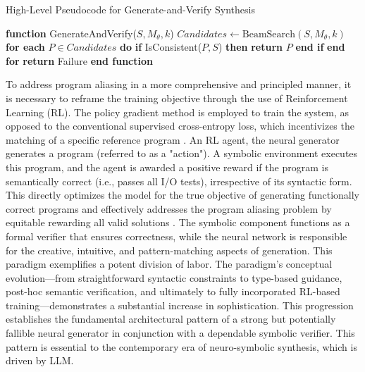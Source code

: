 \documentclass[12pt, a4paper]{report}
\begin{document}
\begin{algorithm}
\caption{High-Level Pseudocode for Generate-and-Verify Synthesis}
\label{alg:generate_verify}
\begin{algorithmic}[1]
\STATE \textbf{function} GenerateAndVerify($S, M_{\theta}, k$)
\STATE \quad {}
\STATE \quad $\textit{Candidates} \leftarrow \text{BeamSearch}(S, M_{\theta}, k)$
\STATE
\STATE \quad {}
\STATE \quad \textbf{for each} $P \in \textit{Candidates}$ \textbf{do}
\STATE \quad \quad \textbf{if} IsConsistent($P, S$) \textbf{then}
\STATE \quad \quad \quad \textbf{return} $P$
\STATE \quad \quad \textbf{end if}
\STATE \quad \textbf{end for}
\STATE
\STATE \quad \textbf{return} Failure
\STATE \textbf{end function}
\end{algorithmic}
\end{algorithm}

To address program aliasing in a more comprehensive and principled manner, it is necessary to reframe the training objective through the use of Reinforcement Learning (RL). The policy gradient method is employed to train the system, as opposed to the conventional supervised cross-entropy loss, which incentivizes the matching of a specific reference program \citep{chen2018execution}. An RL agent, the neural generator generates a program (referred to as a "action"). A symbolic environment executes this program, and the agent is awarded a positive reward if the program is semantically correct (i.e., passes all I/O tests), irrespective of its syntactic form. This directly optimizes the model for the true objective of generating functionally correct programs and effectively addresses the program aliasing problem by equitable rewarding all valid solutions \citep{shah2020learning}.
The symbolic component functions as a formal verifier that ensures correctness, while the neural network is responsible for the creative, intuitive, and pattern-matching aspects of generation. This paradigm exemplifies a potent division of labor. The paradigm's conceptual evolution—from straightforward syntactic constraints to type-based guidance, post-hoc semantic verification, and ultimately to fully incorporated RL-based training—demonstrates a substantial increase in sophistication. This progression establishes the fundamental architectural pattern of a strong but potentially fallible neural generator in conjunction with a dependable symbolic verifier. This pattern is essential to the contemporary era of neuro-symbolic synthesis, which is driven by LLM.
\end{document}

